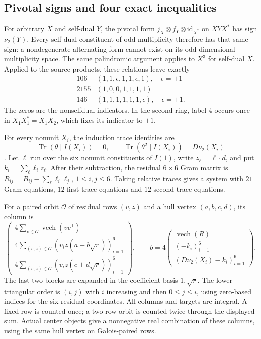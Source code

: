\subsection{Pivotal signs and four exact inequalities}
For arbitrary $X$ and self-dual $Y$, the pivotal form
$j_X\otimes f_Y\otimes\mathrm{id}_{X^*}$ on $XYX^*$ has sign
$\nu_2(Y)$. Every self-dual constituent of odd multiplicity therefore
has that same sign: a nondegenerate alternating form cannot exist
on its odd-dimensional multiplicity space. The same palindromic
argument applies to $X^3$ for self-dual $X$. Applied to the source
products, these relations leave exactly
\[
\begin{array}{c|c}
106&(1,1,\epsilon,1,1,\epsilon,1),\quad\epsilon=\pm1\\
2155&(1,0,0,1,1,1,1)\\
146&(1,1,1,1,1,1,\epsilon),\quad\epsilon=\pm1.
\end{array}
\]
The zeros are the nonselfdual indicators. In the second ring, label
$4$ occurs once in $X_1X_1^*=X_1X_2$, which fixes its indicator
to $+1$.

For every nonunit $X_i$, the induction trace identities are
\[
 \operatorname{Tr}(\theta\mid I(X_i))=0,\qquad
 \operatorname{Tr}(\theta^2\mid I(X_i))=D\nu_2(X_i)
\]
\cite[Theorems~2.5 and~2.7]{OstrikRank3}. Let $\ell$ run over the
six nonunit constituents of $I(1)$, write $z_\ell=\ell\cdot d$,
and put $k_i=\sum_\ell\ell_i z_\ell$. After their subtraction,
the residual $6\times6$ Gram matrix is
$R_{ij}=B_{ij}-\sum_\ell\ell_i\ell_j$, $1\leq i,j\leq6$.
Taking relative traces gives a system with $21$ Gram equations,
$12$ first-trace equations and $12$ second-trace equations.

For a paired orbit $\mathcal O$ of residual rows $(v,z)$ and a hull
vertex $(a,b,c,d)$, its column is
\begin{equation}\label{eq:quadratic-moment-column}
 \begin{pmatrix}
 4\sum_{v\in\mathcal O}\operatorname{vech}(vv^{\mathsf T})\\
 4\sum_{(v,z)\in\mathcal O}(v_i z(a+b\sqrt r))_{i=1}^6\\
 4\sum_{(v,z)\in\mathcal O}(v_i z(c+d\sqrt r))_{i=1}^6
 \end{pmatrix},
 \qquad
 b=4\begin{pmatrix}
 \operatorname{vech}(R)\\(-k_i)_{i=1}^6\\
 (D\nu_2(X_i)-k_i)_{i=1}^6
 \end{pmatrix}.
\end{equation}
The last two blocks are expanded in the coefficient basis $1,\sqrt r$.
The lower-triangular order is $(i,j)$ with $i$ increasing and then
$0\leq j\leq i$, using zero-based indices for the six residual
coordinates. All columns and targets are integral. A fixed row is
counted once; a two-row orbit is counted twice through the displayed
sum. Actual center objects give a nonnegative real combination of
these columns, using the same hull vertex on Galois-paired rows.

